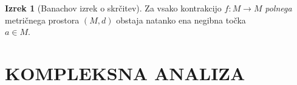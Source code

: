 \documentclass[11pt]{article}
\theoremstyle{definition}
\theoremstyle{definition}
\theoremstyle{definition}
\newtheorem{izrek}{Izrek}[section]
\begin{document}
\begin{izrek}[Banachov izrek o skrčitev]

Za vsako kontrakcijo $f: M \rightarrow M$ \textit{polnega} metričnega prostora $(M, d)$ obstaja natanko ena negibna točka \\$a \in M$.

\end{izrek}
\vspace{0.5cm}



\pagebreak


\section{KOMPLEKSNA ANALIZA}
\vspace{0.5cm}

\end{document}
